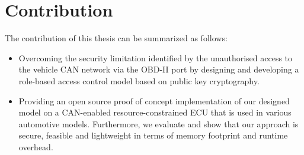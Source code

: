 \section{Contribution}
\label{sec:contributions}

The contribution of this thesis can be summarized as follows:

\begin{itemize}
	\item Overcoming the security limitation identified by the unauthorised access to the vehicle CAN network via the OBD-II port by designing and developing a role-based access control model based on public key cryptography.
	
	\item Providing an open source proof of concept implementation of our designed model on a CAN-enabled resource-constrained ECU that is used in various automotive models. Furthermore, we evaluate and show that our approach is secure, feasible and lightweight in terms of memory footprint and runtime overhead.
\end{itemize} 

